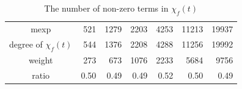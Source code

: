 \documentclass{svmult}
\def\bbf2{\ifmmode\mathbb{F}_2\else$\mathbb{F}_2$\fi}%
\begin{document}
\begin{table}[ht]
  \begin{center}
    \caption{The number of non-zero terms in $\chi_f(t)$}
    \label{tab:weight}
    \begin{tabular}{c|rrrrrr} \hline
      mexp & 521 & 1279 & 2203 & 4253 & 11213 & 19937 \\
      degree of $\chi_f(t)$ & 544 & 1376 & 2208 & 4288 & 11256 & 19992 \\
      weight & 273 & 673 & 1076 & 2233 & 5684 & 9756 \\
      ratio & 0.50 & 0.49 & 0.49 & 0.52 & 0.50 & 0.49 \\ \hline
    \end{tabular}
  \end{center}
\end{table}

\end{document}
